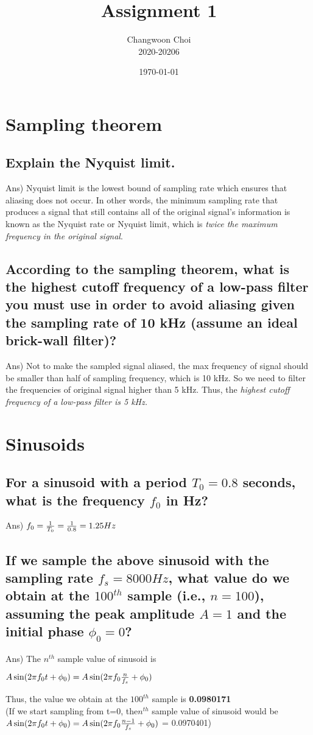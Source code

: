 \documentclass[12pt]{article}%
\begin{document}
\title{Assignment 1}
\author{Changwoon Choi \\ 2020-20206}
\date{\today}
\maketitle

\section{Sampling theorem}
\subsection{Explain the Nyquist limit.}
Ans) Nyquist limit is the lowest bound of sampling rate which ensures that aliasing does not occur. In other words, the minimum sampling rate that produces a signal that still contains all of the original signal's information is known as the Nyquist rate or Nyquist limit, which is \textit{twice the maximum frequency in the original signal}.

\subsection{According to the sampling theorem, what is the highest cutoff frequency of a low-pass filter you must use in order to avoid aliasing given the sampling rate of 10 kHz (assume an ideal brick-wall filter)?}
Ans) Not to make the sampled signal aliased, the max frequency of signal should be smaller than half of sampling frequency, which is 10 kHz. So we need to filter the frequencies of original signal higher than 5 kHz. Thus, the \textit{highest cutoff frequency of a low-pass filter is 5 kHz.}

\section{Sinusoids}

\subsection{For a sinusoid with a period $T_0 = 0.8$  seconds, what is the frequency $f_0$ in Hz?}
Ans) 
$f_0 = {1 \over T_0} = {1 \over 0.8} = 1.25Hz$

\subsection{If we sample the above sinusoid with the sampling rate $f_s=8000 Hz$, what value do we obtain at the $100^{th}$  sample (i.e., $n=100$), assuming the peak amplitude $A=1$  and the initial phase $\phi_0 = 0$?}
Ans) The $n^{th}$ sample value of sinusoid is 
\begin{center}
	$A \sin(2 \pi f_0 t + \phi_0) = A \sin(2 \pi f_0 {n \over f_s} + \phi_0)$
\end{center}
Thus, the value we obtain at the $100^{th}$ sample is \textbf{0.0980171} \\
(If we start sampling from t=0, the$n^{th}$ sample value of sinusoid would be $A \sin(2 \pi f_0 t + \phi_0) = A \sin(2 \pi f_0 {n-1 \over f_s} + \phi_0 )$ = 0.0970401)
\end{document}
